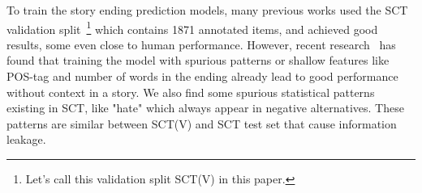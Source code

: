 
To train the story ending prediction models, many previous works
used the SCT validation split~\footnote{Let's call this validation
split SCT(V) in this paper.} which contains 1871 annotated items,
and achieved good results, some even close to human performance.
However, recent research~\cite{sharma2018tackling} has found that 
training the model with spurious patterns or shallow features
 like POS-tag and number of words in the ending 
already lead to good performance without context in a story.
We also find some spurious statistical patterns existing in SCT, like "hate" which 
always appear in negative alternatives. These patterns are similar between 
SCT(V) and SCT test set that cause information leakage.

